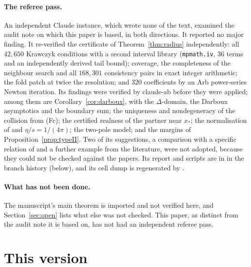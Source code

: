 \paragraph{The referee pass.}
An independent Claude instance, which wrote none of the text, examined the audit note on which this paper is based, in both directions. It reported no major finding. It re-verified the certificate of Theorem~\ref{thm:radius} independently: all $42{,}650$ Krawczyk conditions with a second interval library (\texttt{mpmath.iv}, $36$ terms and an independently derived tail bound); coverage, the completeness of the neighbour search and all $168{,}301$ consistency pairs in exact integer arithmetic; the fold patch at twice the resolution; and $320$ coefficients by an Arb power-series Newton iteration. Its findings were verified by claude-ab before they were applied; among them are Corollary~\ref{cor:darboux}, with the $\Delta$-domain, the Darboux asymptotics and the boundary sum; the uniqueness and nondegeneracy of the collision from (Fc); the certified realness of the partner near $x_*$; the normalisation of \cite{GKST} and $\eta/s=1/(4\pi)$; the two-pole model; and the margins of Proposition~\ref{prop:typeII}. Two of its suggestions, a comparison with a specific relation of \cite{ADGS} and a further example from the literature, were not adopted, because they could not be checked against the papers. Its report and scripts are in  in the branch history (below), and its cell dump is regenerated by .

\paragraph{What has not been done.}
The manuscript's main theorem is imported and not verified here, and Section~\ref{sec:open} lists what else was not checked. This paper, as distinct from the audit note it is based on, has not had an independent referee pass.

\section{This version}\label{app:changes}

